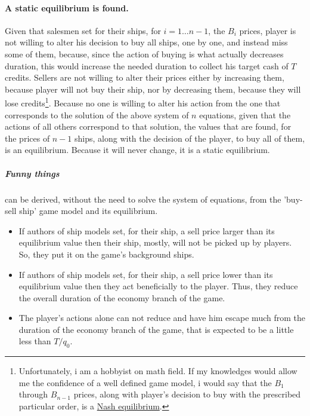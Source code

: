 \documentclass[]{article}
\begin{document}
 \paragraph{A static equilibrium is found.} Given that salesmen set for their ships, for $i=1\ldots n-1$, the $B_{i}$ prices,  player is not willing to alter his decision to buy all ships, one by one, and instead miss some of them, because, since the action of buying is what actually decreases duration, this would increase the needed duration to collect his target cash of $T$ credits. Sellers are not willing to alter their prices either by increasing them, because player will not buy their ship, nor by decreasing them, because they will lose credits\footnote{Unfortunately, i am a hobbyist on math field. If my knowledges would allow me the confidence of a well defined game model, i would say that the $B_{1}$ through $B_{n-1}$ prices, along with player's decision to buy with the prescribed particular order, is a \hyperref{https://en.wikipedia.org/wiki/Nash_equilibrium}{}{}{Nash equilibrium}.}. Because no one is willing to alter his action from the one that corresponds to the solution of the above system of $n$ equations, given that the actions of all others correspond to that solution, the values that are found, for the prices of $n-1$ ships, along with the decision of the player, to buy all of them, is an equilibrium. Because it will never change, it is a static equilibrium. 
 \subparagraph{Funny things} can be derived, without the need to solve the system of equations, from the 'buy-sell ship' game model and its equilibrium.
 \begin{itemize}
 	\item If authors of ship models set, for their ship, a sell price larger than its equilibrium value then their ship, mostly, will not be picked up by players. So, they put it on the game's background ships.
 	\item If authors of ship models set, for their ship, a sell price lower than its equilibrium value then they act beneficially to the player. Thus, they reduce the overall duration of the economy branch of the game.
 	\item The player's actions alone can not reduce and have him escape much from the duration of the economy branch of the game, that is expected to be a little less than $T/q_{0}$.
 \end{itemize}
\end{document}
